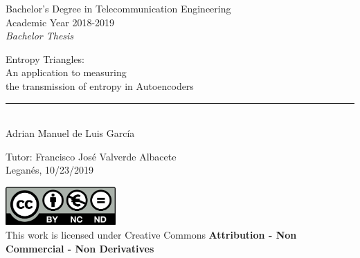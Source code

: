 \documentclass[12pt]{report}
\begin{document}
	
\begin{titlepage}
	\begin{sffamily}
	\color{azulUC3M}
	\begin{center}
		\begin{figure}[H] %
		\end{figure}
		\vspace{2.5cm}
		\begin{Large}
			Bachelor's Degree in Telecommunication Engineering\\			
			Academic Year 2018-2019\\
			\vspace{2cm}		
			\textsl{Bachelor Thesis}
			\bigskip
			
		\end{Large}
		 	{\Huge Entropy Triangles:}\\
		 	{\Large An application to measuring\\the transmission of entropy in Autoencoders}\\
		 	\vspace*{0.5cm}
	 		\rule{10.5cm}{0.1mm}\\
			{\LARGE Adrian Manuel de Luis Garc\'ia}\\ 
			\vspace*{1cm}
		\begin{Large}
			Tutor: Francisco Jos\'e Valverde Albacete\\
			Legan\'es, 10/23/2019\\
		\end{Large}
	\end{center}
	\vfill
	\color{black}
	\includegraphics[width=4.2cm]{imagenes/creativecommons.png}\\  %
	This work is licensed under Creative Commons \textbf{Attribution - Non Commercial - Non Derivatives}
	\end{sffamily}
\end{titlepage}
\end{document}
